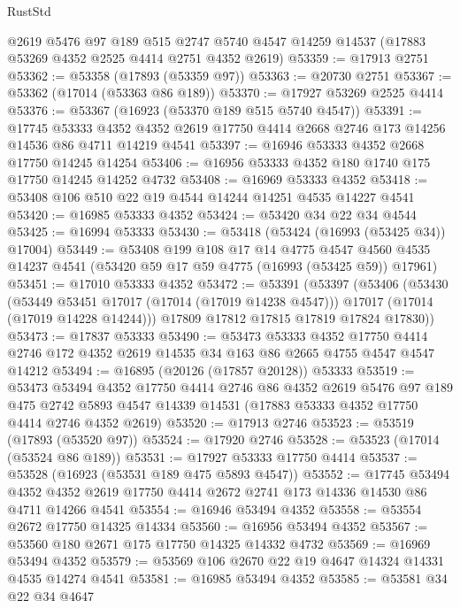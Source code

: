 \begin{lexlean}{RustStd}
\begin{coremodule}
{\begin{coremodule}
{{{{{{{{{{{{{{{{{{{{{{{{{{{{{{{{{{{{{{{{{{{{{{{{{{{{{{{    @2619
    @5476
    @97
    @189
    @515
    @2747
    @5740
    @4547
    @14259
    @14537
    (@17883 @53269 @4352 @2525 @4414 @2751 @4352 @2619)
@53359 := @17913 @2751
@53362 := @53358 (@17893 (@53359 @97))
@53363 := @20730 @2751
@53367 := @53362 (@17014 (@53363 @86 @189))
@53370 := @17927 @53269 @2525 @4414
@53376 := @53367 (@16923 (@53370 @189 @515 @5740 @4547))
@53391 := @17745
    @53333
    @4352
    @4352
    @2619
    @17750
    @4414
    @2668
    @2746
    @173
    @14256
    @14536
    @86
    @4711
    @14219
    @4541
@53397 := @16946 @53333 @4352 @2668 @17750 @14245 @14254
@53406 := @16956 @53333 @4352 @180 @1740 @175 @17750 @14245 @14252 @4732
@53408 := @16969 @53333 @4352
@53418 := @53408 @106 @510 @22 @19 @4544 @14244 @14251 @4535 @14227 @4541
@53420 := @16985 @53333 @4352
@53424 := @53420 @34 @22 @34 @4544
@53425 := @16994 @53333
@53430 := @53418 (@53424 (@16993 (@53425 @34)) @17004)
@53449 := @53408
    @199
    @108
    @17
    @14
    @4775
    @4547
    @4560
    @4535
    @14237
    @4541
    (@53420 @59 @17 @59 @4775 (@16993 (@53425 @59)) @17961)
@53451 := @17010 @53333 @4352
@53472 := @53391
    (@53397
      (@53406
        (@53430
          (@53449 @53451 @17017 (@17014 (@17019 @14238 @4547)))
          @17017
          (@17014 (@17019 @14228 @14244)))
        @17809
        @17812
        @17815
        @17819
        @17824
        @17830))
@53473 := @17837 @53333
@53490 := @53473
    @53333
    @4352
    @17750
    @4414
    @2746
    @172
    @4352
    @2619
    @14535
    @34
    @163
    @86
    @2665
    @4755
    @4547
    @4547
    @14212
@53494 := @16895 (@20126 (@17857 @20128)) @53333
@53519 := @53473
    @53494
    @4352
    @17750
    @4414
    @2746
    @86
    @4352
    @2619
    @5476
    @97
    @189
    @475
    @2742
    @5893
    @4547
    @14339
    @14531
    (@17883 @53333 @4352 @17750 @4414 @2746 @4352 @2619)
@53520 := @17913 @2746
@53523 := @53519 (@17893 (@53520 @97))
@53524 := @17920 @2746
@53528 := @53523 (@17014 (@53524 @86 @189))
@53531 := @17927 @53333 @17750 @4414
@53537 := @53528 (@16923 (@53531 @189 @475 @5893 @4547))
@53552 := @17745
    @53494
    @4352
    @4352
    @2619
    @17750
    @4414
    @2672
    @2741
    @173
    @14336
    @14530
    @86
    @4711
    @14266
    @4541
@53554 := @16946 @53494 @4352
@53558 := @53554 @2672 @17750 @14325 @14334
@53560 := @16956 @53494 @4352
@53567 := @53560 @180 @2671 @175 @17750 @14325 @14332 @4732
@53569 := @16969 @53494 @4352
@53579 := @53569 @106 @2670 @22 @19 @4647 @14324 @14331 @4535 @14274 @4541
@53581 := @16985 @53494 @4352
@53585 := @53581 @34 @22 @34 @4647
}}}}}}}}}}}}}}}}}}}}}}}}}}}}}}}}}}}}}}}}}}}}}}}}}}}}}}}
\end{coremodule}}
\end{coremodule}
\end{lexlean}
